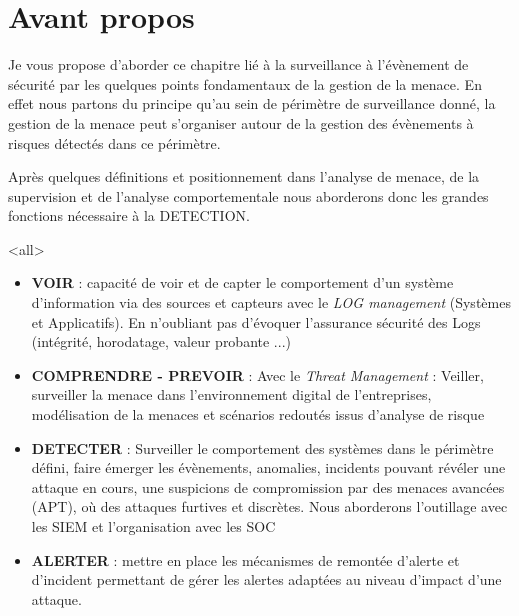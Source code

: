 
\section{Avant propos}

Je vous propose d'aborder ce chapitre lié à la surveillance à l'évènement de sécurité par les quelques points fondamentaux de la gestion de la menace.
En effet nous partons du principe qu'au sein de périmètre de surveillance donné, la gestion de la menace peut s'organiser autour de la gestion des évènements à risques détectés dans ce périmètre.


Après quelques définitions et positionnement dans l'analyse de menace,  de la supervision et de l'analyse comportementale nous aborderons donc les grandes fonctions nécessaire à la DETECTION.

\mode<all>{
{
\begin{itemize}
  \item \textbf{VOIR} :  capacité de voir et de capter le comportement d'un système d'information via des sources et capteurs avec le \textit{LOG management} (Systèmes et Applicatifs). En n'oubliant pas d'évoquer l'assurance sécurité des Logs (intégrité, horodatage, valeur probante ...)
\item \textbf{COMPRENDRE - PREVOIR} : Avec le \textit{Threat Management} : Veiller, surveiller la menace dans l'environnement digital de l'entreprises, modélisation de la menaces et scénarios redoutés issus d'analyse de risque
\item \textbf{DETECTER} : Surveiller le comportement des systèmes dans le périmètre défini, faire émerger les  évènements, anomalies, incidents pouvant révéler une attaque en cours, une suspicions de compromission par des menaces avancées (APT), où des attaques furtives et discrètes. Nous aborderons l'outillage avec les SIEM et l'organisation avec les SOC
\item \textbf{ALERTER} : mettre en place les mécanismes de remontée d'alerte et d'incident permettant de gérer les alertes adaptées au niveau d'impact d'une attaque. 
\end{itemize}
}}



